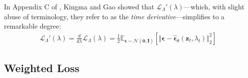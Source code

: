 \documentclass[ oneside,%
                    author={George Herbert},
                    degree={MSci},
                     title={Video Diffusion Models for Climate Simulations},
                  subtitle={}]{dissertation}
\begin{document}
In Appendix C of \cite{Understanding_Diffusion_Objective_Kingma}, Kingma and Gao showed that $\mathcal{L}_\Lambda'(\lambda)$---which, with slight abuse of terminology, they refer to as the \textit{time derivative}---simplifies to a remarkable degree:
\begin{align}
      \mathcal{L}_{\Lambda}'(\lambda)=\frac{d}{d\lambda}\mathcal{L}_\Lambda(\lambda)=\frac{1}{2}\mathbb{E}_{\boldsymbol\epsilon\sim\mathcal{N}(\mathbf{0}, \mathbf{I})}\left[\Vert \boldsymbol\epsilon -\hat{\boldsymbol\epsilon}_\theta(\mathbf{z}_t,\lambda_t)\Vert_2^2\right]\label{eq:time_derivative}
\end{align} 

\subsection{Weighted Loss}
\label{sec:background_diffusion_weighted_loss}
\end{document}
